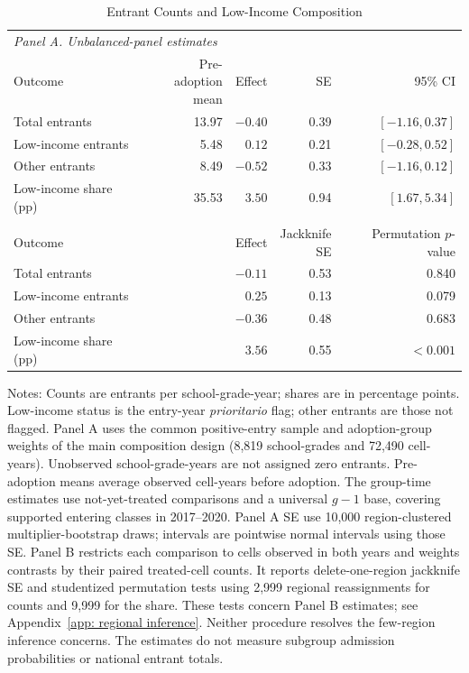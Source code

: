 \begin{table}[!htbp]
\singlespacing\renewcommand{\arraystretch}{1.2}
\centering
\caption{Entrant Counts and Low-Income Composition}
\label{tab: entrant counts}
\small
\setlength{\tabcolsep}{4pt}
\begin{tabular*}{\textwidth}{@{\extracolsep{\fill}}lrrrr@{}}
\toprule
\multicolumn{5}{l}{\textit{Panel A. Unbalanced-panel estimates}} \\[3pt]
Outcome & \makecell{Pre-adoption\\mean} & Effect & SE & 95\% CI \\
\midrule
Total entrants & 13.97 & $-0.40$ & 0.39 & $[-1.16, 0.37]$ \\
Low-income entrants & 5.48 & $0.12$ & 0.21 & $[-0.28, 0.52]$ \\
Other entrants & 8.49 & $-0.52$ & 0.33 & $[-1.16, 0.12]$ \\
Low-income share (pp) & 35.53 & $3.50$ & 0.94 & $[1.67, 5.34]$ \\
\addlinespace[9pt]
\multicolumn{5}{l}{\textit{Panel B. Paired estimates and regional permutation tests}} \\[3pt]
Outcome & & Effect & \makecell{Jackknife\\SE} & \makecell{Permutation\\$p$-value} \\
\midrule
Total entrants & & $-0.11$ & 0.53 & 0.840 \\
Low-income entrants & & $0.25$ & 0.13 & 0.079 \\
Other entrants & & $-0.36$ & 0.48 & 0.683 \\
Low-income share (pp) & & $3.56$ & 0.55 & $<0.001$ \\
\bottomrule
\end{tabular*}
\par\smallskip
\begin{minipage}{\textwidth}\footnotesize
Notes: Counts are entrants per school-grade-year; shares are in percentage points. Low-income status is the entry-year \emph{prioritario} flag; other entrants are those not flagged. Panel A uses the common positive-entry sample and adoption-group weights of the main composition design (8,819 school-grades and 72,490 cell-years). Unobserved school-grade-years are not assigned zero entrants. Pre-adoption means average observed cell-years before adoption. The group-time estimates use not-yet-treated comparisons and a universal $g-1$ base, covering supported entering classes in 2017--2020. Panel A SE use 10,000 region-clustered multiplier-bootstrap draws; intervals are pointwise normal intervals using those SE. Panel B restricts each comparison to cells observed in both years and weights contrasts by their paired treated-cell counts. It reports delete-one-region jackknife SE and studentized permutation tests using 2,999 regional reassignments for counts and 9,999 for the share. These tests concern Panel B estimates; see Appendix~\ref{app: regional inference}. Neither procedure resolves the few-region inference concerns. The estimates do not measure subgroup admission probabilities or national entrant totals.
\end{minipage}
\end{table}
